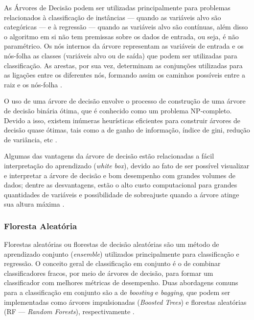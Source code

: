 \documentclass[
	12pt,				%
	oneside,			%
	a4paper,			%
	english,			%
	brazil				%
	]{abntex2ppgsi}
\begin{document}
{As Árvores de Decisão podem ser utilizadas principalmente para problemas relacionados à classificação de instâncias --- quando as variáveis alvo são categóricas --- e à regressão --- quando as variáveis alvo são contínuas, além disso o algoritmo em si não tem premissas sobre os dados de entrada, ou seja, é não paramétrico. Os nós internos da árvore representam as variáveis de entrada e os nós-folha as classes (variáveis alvo ou de saída) que podem ser utilizadas para classificação. As arestas, por sua vez, determinam as conjunções utilizadas para as ligações entre os diferentes nós, formando assim os caminhos possíveis entre a raiz e os nós-folha \cite{kotsiantis2007supervised}.

O uso de uma árvore de decisão envolve o processo de construção de uma árvore de decisão binária ótima, que é conhecido como um problema NP-completo. Devido a isso, existem inúmeras heurísticas eficientes para construir árvores de decisão quase ótimas, tais como a de ganho de informação, índice de gini, redução de variância, etc \cite{kotsiantis2007supervised}. 

Algumas das vantagens da árvore de decisão estão relacionadas a fácil interpretação do aprendizado (\textit{white box}), devido ao fato de ser possível visualizar e interpretar a árvore de decisão e bom desempenho com grandes volumes de dados; dentre as desvantagens, estão o alto custo computacional para grandes quantidades de variáveis e possibilidade de sobreajuste quando a árvore atinge sua altura máxima \cite{kotsiantis2007supervised, dwivedi2016automatic}.

\subsubsection{Floresta Aleatória}

Florestas aleatórias ou florestas de decisão aleatórias são um método de aprendizado conjunto (\textit{ensemble}) utilizados principalmente  para classificação e regressão. O conceito geral de classificação em conjunto é o de combinar classificadores fracos, por meio de árvores de decisão, para formar um classificador com melhores métricas de desempenho. Duas abordagens comuns para a classificação em conjunto são a de \textit{boosting} e \textit{bagging}, que podem ser implementadas como árvores impulsionadas (\textit{Boosted Trees}) e florestas aleatórias (RF --- \textit{Random Forests}), respectivamente \cite{mcdonald2014steering}.

}
\end{document}
